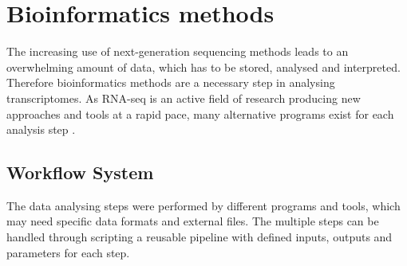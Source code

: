 \documentclass[12pt, a4paper]{report}
\begin{document}
\section{Bioinformatics methods}
The increasing use of next-generation sequencing methods leads to an overwhelming amount of data, which has to be stored, analysed and interpreted. Therefore bioinformatics methods are a necessary step in analysing transcriptomes. As RNA-seq is an active field of research producing new approaches and tools at a rapid pace, many alternative programs exist for each analysis step \cite{Korpelainen2014}. 

\subsection{Workflow System}
The data analysing steps were performed by different programs and tools, which may need specific data formats and external files. The multiple steps can be handled through scripting a reusable pipeline with defined inputs, outputs and parameters for each step. 
\end{document}

